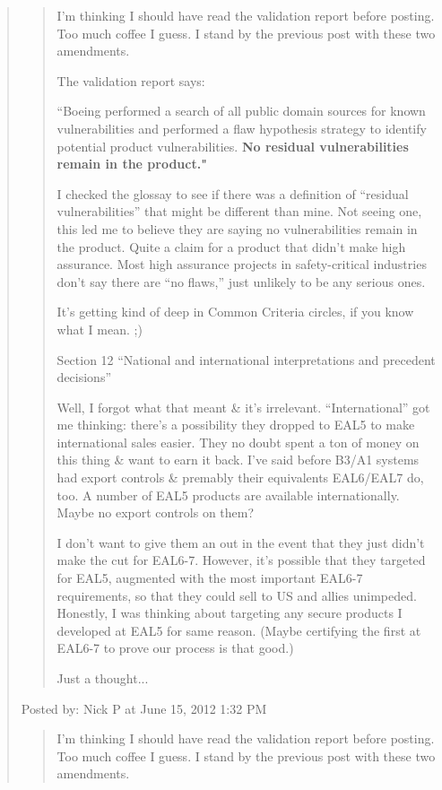 \documentclass[a4paper]{article}
\begin{document}
\begin{quote}
\begin{quotation}
I'm thinking I should have read the validation report before posting. Too much coffee I guess. I
stand by the previous post with these two amendments.

The validation report says:

``Boeing performed a search of all public domain sources for known vulnerabilities and performed a
flaw hypothesis strategy to identify potential product vulnerabilities. \textbf{No residual
vulnerabilities remain in the product."}

I checked the glossay to see if there was a definition of ``residual vulnerabilities'' that might be
different than mine. Not seeing one, this led me to believe they are saying no vulnerabilities
remain in the product. Quite a claim for a product that didn't make high assurance. Most high
assurance projects in safety-critical industries don't say there are ``no flaws,'' just unlikely to
be any serious ones.

It's getting kind of deep in Common Criteria circles, if you know what I mean. ;)

Section 12 ``National and international interpretations and precedent decisions''

Well, I forgot what that meant \& it's irrelevant. ``International'' got me thinking: there's a
possibility they dropped to EAL5 to make international sales easier. They no doubt spent a ton of
money on this thing \& want to earn it back. I've said before B3/A1 systems had export controls \&
premably their equivalents EAL6/EAL7 do, too. A number of EAL5 products are available
internationally. Maybe no export controls on them?

I don't want to give them an out in the event that they just didn't make the cut for EAL6-7.
However, it's possible that they targeted for EAL5, augmented with the most important EAL6-7
requirements, so that they could sell to US and allies unimpeded. Honestly, I was thinking about
targeting any secure products I developed at EAL5 for same reason. (Maybe certifying the first at
EAL6-7 to prove our process is that good.)

Just a thought...
\end{quotation}
Posted by: Nick P at June 15, 2012 1:32 PM

\begin{quotation}
I'm thinking I should have read the validation report before posting. Too much coffee I guess. I
stand by the previous post with these two amendments.


\end{quotation}
\end{quote}
\end{document}
